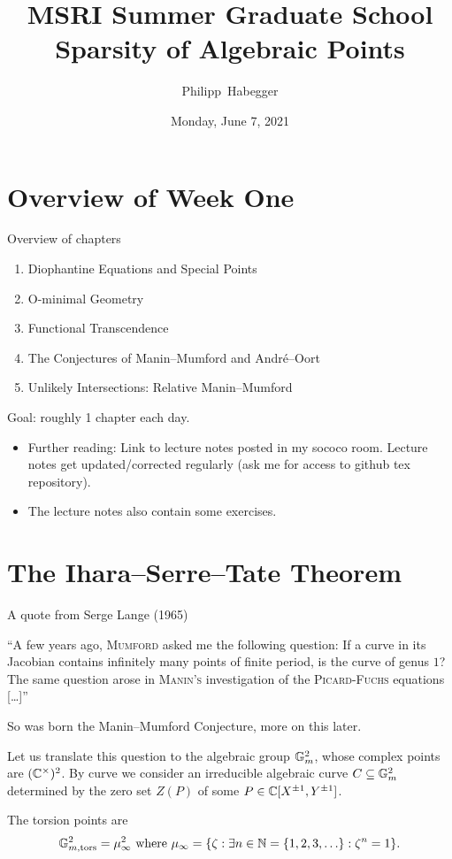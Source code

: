 \documentclass{beamer}
\title{MSRI Summer Graduate School \\ Sparsity of Algebraic Points}
\author{Philipp~Habegger}
\date{Monday, June 7, 2021}
\begin{document}
\setlength{\abovecaptionskip}{0pt} 
\setlength{\belowcaptionskip}{0pt} 

\renewcommand{\figurename}{Fig.}


\begin{frame}
  \titlepage
\end{frame}

\section{Overview of Week One}

\begin{frame}{Overview of chapters}
  \begin{enumerate}
  \item Diophantine Equations and Special Points
  \item O-minimal Geometry
  \item Functional Transcendence
  \item The Conjectures of Manin--Mumford and Andr\'e--Oort
  \item Unlikely Intersections: Relative Manin--Mumford
  \end{enumerate}

  Goal: roughly 1 chapter each day.

  \begin{itemize}
  \item   Further reading: Link to \alert{lecture notes} posted in my sococo
    room. Lecture notes get updated/corrected regularly
    (ask me for access to github tex repository).
  \item The lecture notes also contain some exercises.
  \end{itemize}
\end{frame}

\section{The Ihara--Serre--Tate Theorem}

\begin{frame}{A quote from Serge Lange (1965)}
  \bigskip
  
  \begin{displayquote}
    ``A few years ago, \textsc{Mumford} asked me the following question:
    If a curve in its Jacobian contains infinitely many points of finite
    period, is the curve of genus $1$? The same question arose in
    \textsc{Manin's} investigation of the \textsc{Picard-Fuchs}
    equations [\ldots]''
  \end{displayquote}

  So was born the Manin--Mumford Conjecture, more on this later.

  Let us translate this question
  to the \alert{algebraic group} ${\mathbb{G}}_m^2$, whose complex points are
  $({\mathbb{C}}^\times)^2$. By
  curve we consider an irreducible algebraic curve $C\subseteq
  {\mathbb{G}}_m^2$ determined  by the zero set $Z(P)$ of
  some $P\in {\mathbb{C}}[X^{\pm 1},Y^{\pm 1}]$.

  The  torsion points are
  $$ {\mathbb{G}}_{m,\mathrm{tors}}^2= \mu_\infty^2  \text{ where
  }\mu_\infty = \{\zeta :\exists n\in{\mathbb{N}}=\{1,2,3,\ldots\}: \zeta^n=1 \}.$$
\end{frame}
\end{document}

